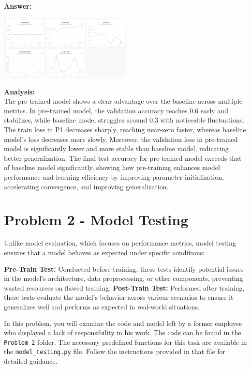\documentclass[11pt, oneside]{article}   	%
\begin{document}
\textbf{Answer:} \\
\begin{center}
    \includegraphics[width=0.5\textwidth]{report_pic/PretrainedModel.png}
\end{center}

\textbf{Analysis: }
\\
The pre-trained model shows a clear advantage over the baseline across multiple metrics. In pre-trained model, the validation accuracy reaches 0.6 early and stabilizes, while baseline model struggles around 0.3 with noticeable fluctuations. The train loss in P1 decreases sharply, reaching near-zero faster, whereas baseline model’s loss decreases more slowly. Moreover, the validation loss in  pre-trained model is significantly lower and more stable than baseline model, indicating better generalization. The final test accuracy for pre-trained model exceeds that of baseline model significantly, showing how pre-training enhances model performance and learning efficiency by improving parameter initialization, accelerating convergence, and improving generalization.


\section*{Problem 2 - Model Testing}
Unlike model evaluation, which focuses on performance metrics, model testing ensures that a model behaves as expected under specific conditions:

\noindent \textbf{Pre-Train Test:} Conducted before training, these tests identify potential issues in the model's architecture, data preprocessing, or other components, preventing wasted resources on flawed training.
 \textbf{Post-Train Test:} Performed after training, these tests evaluate the model's behavior across various scenarios to ensure it generalizes well and performs as expected in real-world situations.

In this problem, you will examine the code and model left by a former employee who displayed a lack of responsibility in his work. The code can be found in the \texttt{Problem 2} folder. The necessary predefined functions for this task are available in the \texttt{model\_testing.py} file. Follow the instructions provided in that file for detailed guidance.
\end{document}
